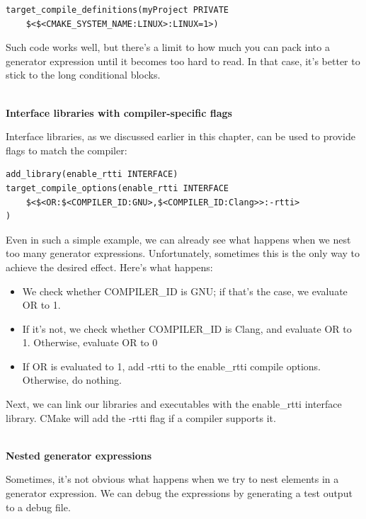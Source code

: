 \begin{lstlisting}[style=styleCMake]
target_compile_definitions(myProject PRIVATE
	$<$<CMAKE_SYSTEM_NAME:LINUX>:LINUX=1>)
\end{lstlisting}

Such code works well, but there's a limit to how much you can pack into a generator expression until it becomes too hard to read. In that case, it's better to stick to the long conditional blocks.

\hspace*{\fill} \\ %
\noindent
\textbf{Interface libraries with compiler-specific flags}

Interface libraries, as we discussed earlier in this chapter, can be used to provide flags to match the compiler:

\begin{lstlisting}[style=styleCMake]
add_library(enable_rtti INTERFACE)
target_compile_options(enable_rtti INTERFACE
	$<$<OR:$<COMPILER_ID:GNU>,$<COMPILER_ID:Clang>>:-rtti>
)
\end{lstlisting}

Even in such a simple example, we can already see what happens when we nest too many generator expressions. Unfortunately, sometimes this is the only way to achieve the desired effect. Here's what happens:

\begin{itemize}
\item 
We check whether COMPILER\_ID is GNU; if that's the case, we evaluate OR to 1.

\item 
If it's not, we check whether COMPILER\_ID is Clang, and evaluate OR to 1. Otherwise, evaluate OR to 0

\item 
If OR is evaluated to 1, add -rtti to the enable\_rtti compile options. Otherwise, do nothing.
\end{itemize}

Next, we can link our libraries and executables with the enable\_rtti interface library. CMake will add the -rtti flag if a compiler supports it.

\hspace*{\fill} \\ %
\noindent
\textbf{Nested generator expressions}

Sometimes, it's not obvious what happens when we try to nest elements in a generator expression. We can debug the expressions by generating a test output to a debug file.

